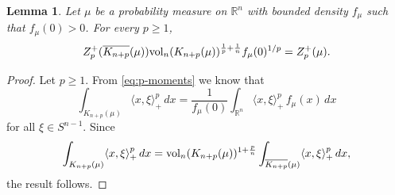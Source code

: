 \documentclass[11pt,leqno]{article}
\newtheorem{lemma}[theorem]{Lemma}
\theoremstyle{definition}
\theoremstyle{remark}
\numberwithin{equation}{section}
\newcommand{\vol}{{\rm vol}}
\newcommand{\gr}{\geqslant}
\newcommand{\1}{\textbf{1}}
\begin{document}
\begin{lemma}\label{lem:passing-to-star-bodies}
Let $\mu$ be a probability measure on $\mathbb{R}^n$ with bounded density $f_{\mu}$
such that $f_{\mu}(0)>0$. For every $p\gr 1$,
\begin{equation*}
Z_p^+(\overline{K_{n+p}}(\mu))\vol_n(K_{n+p}(\mu))^{\frac{1}{p}+\frac{1}{n}}
f_{\mu}(0)^{1/p}=Z_p^+(\mu).\end{equation*}
\end{lemma}

\begin{proof}Let $p\gr 1$. From \eqref{eq:p-moments} we know that
\begin{equation*}
\int_{K_{n+p}(\mu)}\langle x, \xi\rangle_+^p
\,dx=\frac{1}{f_{\mu}(0)}\int_{\mathbb R^n}\langle x, \xi \rangle_+^p\, f_{\mu}(x) \, dx
\end{equation*}for all $\xi\in S^{n-1}$. Since
\begin{equation*}
\int_{K_{n+p}(\mu)}\langle x, \xi\rangle_+^p
\,dx=\vol_n(K_{n+p}(\mu))^{1+\frac{p}{n}}\int_{\overline{K_{n+p}}(\mu)}\langle
x, \xi\rangle_+^p \,dx,\end{equation*}the result follows. \end{proof}
\end{document}
